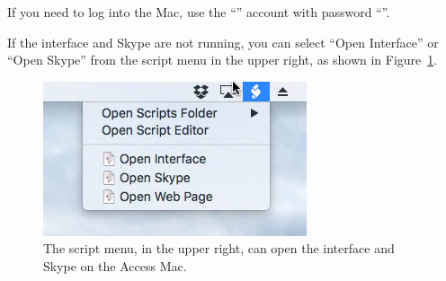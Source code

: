 If you need to log into the Mac, use the “{\projectaccount}” account with password “{\projectaccount}”.

If the interface and Skype are not running, you can select “Open Interface” or “Open Skype” from the script menu in the upper right, as shown in Figure~\ref{figure:interface-scripts-menu}.

\begin{figure}
\begin{center}
\includegraphics[width=0.4\linewidth]{figures/interface-scripts-menu.png}
\end{center}
\caption{The script menu, in the upper right, can open the interface and Skype on the Access Mac.}
\label{figure:interface-scripts-menu}
\end{figure}

